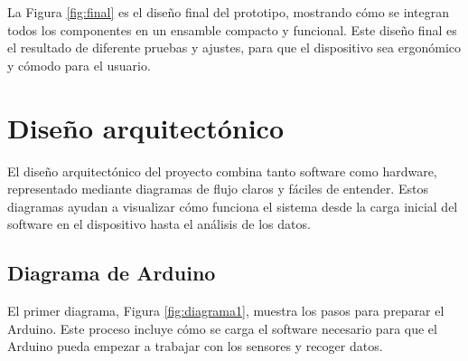 La Figura \ref{fig:final} es el diseño final del prototipo, mostrando cómo se integran todos los componentes en un ensamble compacto y funcional. Este diseño final es el resultado de diferente pruebas y ajustes, para que el dispositivo sea ergonómico y cómodo para el usuario.

\section{Diseño arquitectónico}

El diseño arquitectónico del proyecto combina tanto software como hardware, representado mediante diagramas de flujo claros y fáciles de entender. Estos diagramas ayudan a visualizar cómo funciona el sistema desde la carga inicial del software en el dispositivo hasta el análisis de los datos.

\subsection{Diagrama de Arduino}

El primer diagrama, Figura \ref{fig:diagrama1}, muestra los pasos para preparar el Arduino. Este proceso incluye cómo se carga el software necesario para que el Arduino pueda empezar a trabajar con los sensores y recoger datos.

